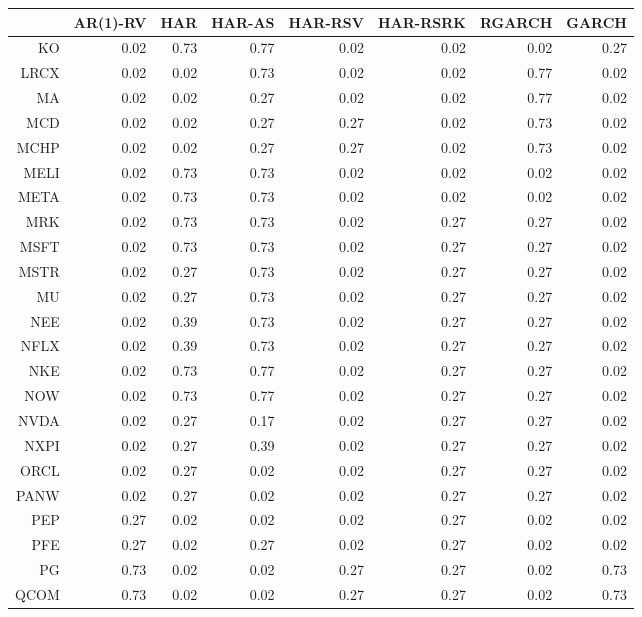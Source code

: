 \begin{table}[ht]
\centering
\begin{tabular}{rrrrrrrr}
  \hline
 & AR(1)-RV & HAR & HAR-AS & HAR-RSV & HAR-RSRK & RGARCH & GARCH \\ 
  \hline
KO & 0.02 & 0.73 & 0.77 & 0.02 & 0.02 & 0.02 & 0.27 \\ 
  LRCX & 0.02 & 0.02 & 0.73 & 0.02 & 0.02 & 0.77 & 0.02 \\ 
  MA & 0.02 & 0.02 & 0.27 & 0.02 & 0.02 & 0.77 & 0.02 \\ 
  MCD & 0.02 & 0.02 & 0.27 & 0.27 & 0.02 & 0.73 & 0.02 \\ 
  MCHP & 0.02 & 0.02 & 0.27 & 0.27 & 0.02 & 0.73 & 0.02 \\ 
  MELI & 0.02 & 0.73 & 0.73 & 0.02 & 0.02 & 0.02 & 0.02 \\ 
  META & 0.02 & 0.73 & 0.73 & 0.02 & 0.02 & 0.02 & 0.02 \\ 
  MRK & 0.02 & 0.73 & 0.73 & 0.02 & 0.27 & 0.27 & 0.02 \\ 
  MSFT & 0.02 & 0.73 & 0.73 & 0.02 & 0.27 & 0.27 & 0.02 \\ 
  MSTR & 0.02 & 0.27 & 0.73 & 0.02 & 0.27 & 0.27 & 0.02 \\ 
  MU & 0.02 & 0.27 & 0.73 & 0.02 & 0.27 & 0.27 & 0.02 \\ 
  NEE & 0.02 & 0.39 & 0.73 & 0.02 & 0.27 & 0.27 & 0.02 \\ 
  NFLX & 0.02 & 0.39 & 0.73 & 0.02 & 0.27 & 0.27 & 0.02 \\ 
  NKE & 0.02 & 0.73 & 0.77 & 0.02 & 0.27 & 0.27 & 0.02 \\ 
  NOW & 0.02 & 0.73 & 0.77 & 0.02 & 0.27 & 0.27 & 0.02 \\ 
  NVDA & 0.02 & 0.27 & 0.17 & 0.02 & 0.27 & 0.27 & 0.02 \\ 
  NXPI & 0.02 & 0.27 & 0.39 & 0.02 & 0.27 & 0.27 & 0.02 \\ 
  ORCL & 0.02 & 0.27 & 0.02 & 0.02 & 0.27 & 0.27 & 0.02 \\ 
  PANW & 0.02 & 0.27 & 0.02 & 0.02 & 0.27 & 0.27 & 0.02 \\ 
  PEP & 0.27 & 0.02 & 0.02 & 0.02 & 0.27 & 0.02 & 0.02 \\ 
  PFE & 0.27 & 0.02 & 0.27 & 0.02 & 0.27 & 0.02 & 0.02 \\ 
  PG & 0.73 & 0.02 & 0.02 & 0.27 & 0.27 & 0.02 & 0.73 \\ 
  QCOM & 0.73 & 0.02 & 0.02 & 0.27 & 0.27 & 0.02 & 0.73 \\ 

\end{tabular}
\end{table}
